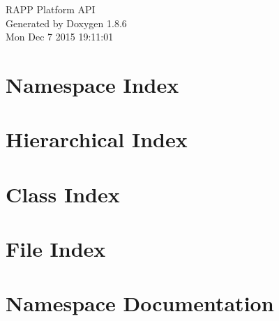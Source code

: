 \documentclass[twoside]{book}
\newcommand{\clearemptydoublepage}{%
  \newpage{\pagestyle{empty}\cleardoublepage}%
}
\begin{document}
\hypersetup{pageanchor=false}
\begin{titlepage}
\vspace*{7cm}
\begin{center}%
{\Large R\-A\-P\-P Platform A\-P\-I }\\
\vspace*{1cm}
{\large Generated by Doxygen 1.8.6}\\
\vspace*{0.5cm}
{\small Mon Dec 7 2015 19:11:01}\\
\end{center}
\end{titlepage}
\clearemptydoublepage
\tableofcontents
\clearemptydoublepage
{}
\hypersetup{pageanchor=true}

\chapter{Namespace Index}

\chapter{Hierarchical Index}

\chapter{Class Index}

\chapter{File Index}

\chapter{Namespace Documentation}












\end{document}
